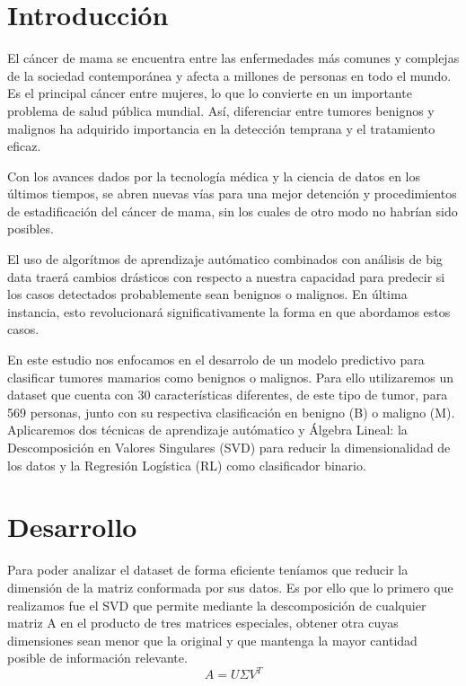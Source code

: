 \documentclass[a4paper,10pt,twocolumn]{article}
\begin{document}
\section{Introducción}\label{sec:intro}
  El cáncer de mama se encuentra entre las enfermedades más comunes y complejas de la sociedad contemporánea y afecta a millones de personas en todo el mundo. Es el principal cáncer entre mujeres, lo que lo convierte en un importante problema de salud pública mundial. Así, diferenciar entre tumores benignos y malignos ha adquirido importancia en la detección temprana y el tratamiento eficaz.

Con los avances dados por la tecnología médica y la ciencia de datos en los últimos tiempos, se abren nuevas vías para una mejor detención y procedimientos de estadificación del cáncer de mama, sin los cuales de otro modo no habrían sido posibles.

El uso de algorítmos de aprendizaje autómatico combinados con análisis de big data traerá cambios drásticos con respecto a nuestra capacidad para predecir si los casos detectados probablemente sean benignos o malignos. En última instancia, esto revolucionará significativamente la forma en que abordamos estos casos.

En este estudio nos enfocamos en el desarrolo de un modelo predictivo para clasificar tumores mamarios como benignos o malignos. Para ello utilizaremos un dataset que cuenta con 30 características diferentes, de este tipo de tumor, para 569 personas, junto con su respectiva clasificación en benigno (B) o maligno (M). Aplicaremos dos técnicas de aprendizaje autómatico y Álgebra Lineal: la Descomposición en Valores Singulares (SVD) para reducir la dimensionalidad de los datos y la Regresión Logística (RL) como clasificador binario.




\section{Desarrollo}\label{sec:dev}
  Para poder analizar el dataset de forma eficiente teníamos que reducir la dimensión de la matriz conformada por sus datos. Es por ello que lo primero que realizamos fue el SVD que permite mediante la descomposición de cualquier matriz A en el producto de tres matrices especiales, obtener otra cuyas dimensiones sean menor que la original y que mantenga la mayor cantidad posible de información relevante.
\[
    A = U \Sigma V^T
\]
\end{document}
